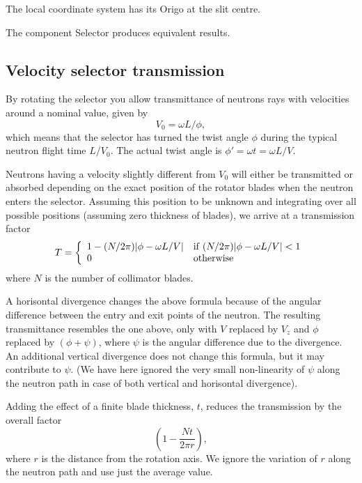 The local coordinate system has its Origo at the slit centre.

The component {\rm Selector} produces equivalent results.

\subsection{Velocity selector transmission}

By rotating the selector you allow
transmittance of neutrons rays with velocities around a nominal value, given by
\begin{equation}
V_0 = \omega L / \phi ,
\end{equation}
which means that the selector has turned the twist angle
$\phi$ during the typical neutron flight time $L/V_0$. The actual twist angle
is $\phi' = \omega t = \omega L / V$.

Neutrons having a velocity slightly different from $V_0$
will either be transmitted or absorbed depending on the exact position
of the rotator blades when the neutron enters the selector.
Assuming this position to be unknown and integrating over all possible
positions (assuming zero thickness of blades), we arrive at a transmission factor
\begin{equation}
T = \left\{
 \begin{array}{ll}
 1 - (N/2\pi ) |\phi-\omega L / V| &
        {\rm if}\;   (N/2\pi )|\phi -\omega L / V| < 1 \\
    0  &  {\rm otherwise}
 \end{array} \right.
\end{equation}
where $N$ is the number of collimator blades.

A horisontal divergence changes the above formula because of the
angular difference between the entry and exit points of the neutron.
The resulting transmittance resembles the one above, only with
$V$ replaced by $V_z$ and $\phi$ replaced by $(\phi +\psi )$,
where $\psi$ is the angular difference due to
the divergence. An additional vertical divergence does not change
this formula, but it may contribute to $\psi$.
(We have here ignored the very small non-linearity of $\psi$ along the
neutron path in case of both vertical and horisontal divergence).

Adding the effect of a finite blade thickness, $t$, reduces the transmission
by the overall factor
\begin{equation}
\left( 1-\frac{N t}{2\pi r}  \right),
\end{equation}
where $r$ is the distance from the rotation axis. We ignore the variation
of $r$ along the neutron path and use just the average value.


